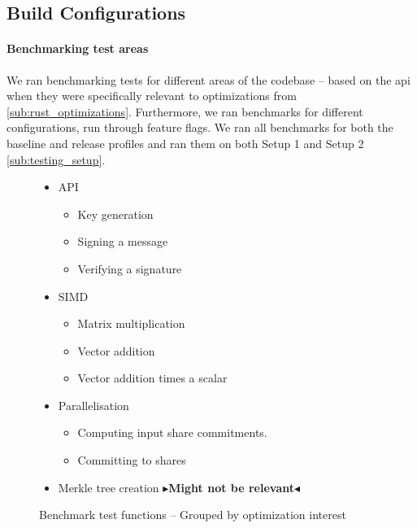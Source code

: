 \documentclass[11pt]{report}
\theoremstyle{definition}
\theoremstyle{plain}
\newcommand{\todo}[1]{{\color[rgb]{.5,0,0}\textbf{$\blacktriangleright$#1$\blacktriangleleft$}}}
\begin{document}
\subsection{Build Configurations}\label{sub:build_config}


\paragraph{Benchmarking test areas}\label{sub:bench_test_areas}

We ran benchmarking tests for different areas of the codebase -- based on the api when they were specifically relevant to optimizations from \autoref{sub:rust_optimizations}. Furthermore, we ran benchmarks for different configurations, run through feature flags. We ran all benchmarks for both the baseline and release profiles and ran them on both Setup 1 and Setup 2 \autoref{sub:testing_setup}.

\begin{figure}
  \begin{itemize}
    \item API
          \begin{itemize}
            \item Key generation
            \item Signing a message 
            \item Verifying a signature
          \end{itemize}
    \item SIMD
          \begin{itemize}
            \item Matrix multiplication
            \item Vector addition
            \item Vector addition times a scalar
          \end{itemize}
    \item Parallelisation
          \begin{itemize}
            \item Computing input share commitments.
            \item Committing to shares
          \end{itemize}
    \item Merkle tree creation \todo{Might not be relevant}
  \end{itemize}
  \caption{Benchmark test functions -- Grouped by optimization interest}\label{fig:bench_test_functions}
\end{figure}
\end{document}
